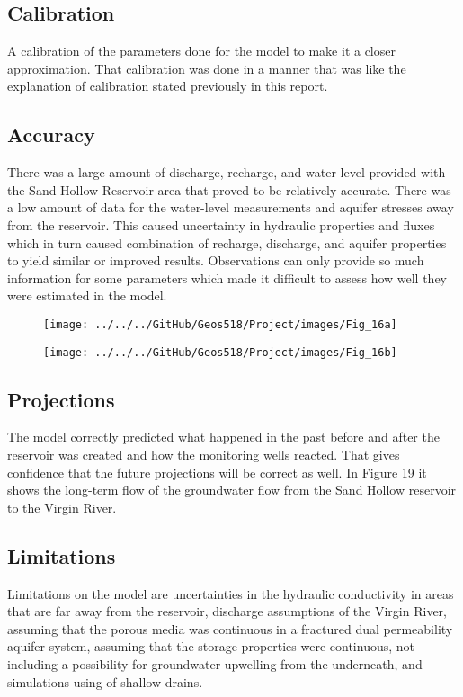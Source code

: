 \documentclass[]{report}
\begin{document}
\subsection{Calibration}
A calibration of the parameters done for the model to make it a closer approximation. That calibration was done in a manner that was like the explanation of calibration stated previously in this report.
\subsection{Accuracy}
There was a large amount of discharge, recharge, and water level provided with the Sand Hollow Reservoir area that proved to be relatively accurate. There was a low amount of data for the water-level measurements and aquifer stresses away from the reservoir. This caused uncertainty in hydraulic properties and fluxes which in turn caused combination of recharge, discharge, and aquifer properties to yield similar or improved results. Observations can only provide so much information for some parameters which made it difficult to assess how well they were estimated in the model.
\begin{figure}[h]
	\centering
	\begin{minipage}{0.4\textwidth}
		\texttt{[image: ../../../GitHub/Geos518/Project/images/Fig\_16a]}
	\end{minipage}
	\hfill
	\begin{minipage}{0.4\textwidth}
		\texttt{[image: ../../../GitHub/Geos518/Project/images/Fig\_16b]}
	\end{minipage}
\end{figure} 
\subsection{Projections}
The model correctly predicted what happened in the past before and after the reservoir was created and how the monitoring wells reacted. That gives confidence that the future projections will be correct as well. In Figure 19 it shows the long-term flow of the groundwater flow from the Sand Hollow reservoir to the Virgin River.
\subsection{Limitations}
Limitations on the model are uncertainties in the hydraulic conductivity in areas that are far away from the reservoir, discharge assumptions of the Virgin River, assuming that the porous media was continuous in a fractured dual permeability aquifer system, assuming that the storage properties were continuous, not including a possibility for groundwater upwelling from the underneath, and simulations using of shallow drains.
\end{document}
